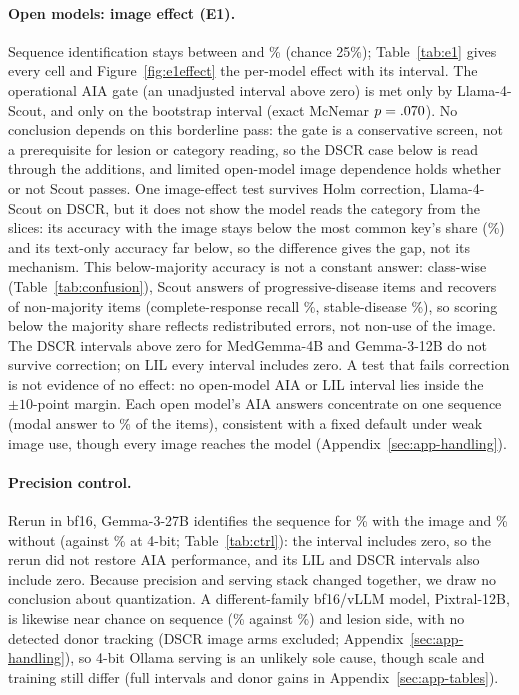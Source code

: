 \documentclass[11pt]{article}
\begin{document}
\paragraph{Open models: image effect (E1).} Sequence identification stays between \vfourEoneOwnAIAGemmaTwelve{} and \vfourEoneOwnAIAScout{}\% (chance 25\%); Table~\ref{tab:e1} gives every cell and Figure~\ref{fig:e1effect} the per-model effect with its interval. The operational AIA gate (an unadjusted interval above zero) is met only by Llama-4-Scout, and only on the bootstrap interval (exact McNemar $p=.070{}$). No conclusion depends on this borderline pass: the gate is a conservative screen, not a prerequisite for lesion or category reading, so the DSCR case below is read through the additions, and limited open-model image dependence holds whether or not Scout passes. One image-effect test survives Holm correction, Llama-4-Scout on DSCR, but it does not show the model reads the category from the slices: its accuracy with the image stays below the most common key's share (\vfourMajorityDSCR{}\%) and its text-only accuracy far below, so the difference gives the gap, not its mechanism. This below-majority accuracy is not a constant answer: class-wise (Table~\ref{tab:confusion}), Scout answers \vfourConfOnMajority{} of \vfourConfOnMajorityN{} progressive-disease items and recovers \vfourConfOffMajority{} of \vfourConfOffMajorityN{} non-majority items (complete-response recall \vfourConfRecallCR{}\%, stable-disease \vfourConfRecallSD{}\%), so scoring below the majority share reflects redistributed errors, not non-use of the image. The DSCR intervals above zero for MedGemma-4B and Gemma-3-12B do not survive correction; on LIL every interval includes zero. A test that fails correction is not evidence of no effect: no open-model AIA or LIL interval lies inside the $\pm10$-point margin. Each open model's AIA answers concentrate on one sequence (modal answer \vfourAiaModalShareLo{} to \vfourAiaModalShareHi{}\% of the \vfourNAIA{} items), consistent with a fixed default under weak image use, though every image reaches the model (Appendix~\ref{sec:app-handling}).

\paragraph{Precision control.} Rerun in bf16, Gemma-3-27B identifies the sequence for \vfourEoneOwnAIAGemmaTwentySevenBf{}\% with the image and \vfourEoneTextAIAGemmaTwentySevenBf{}\% without (against \vfourEoneOwnAIAGemmaTwentySeven{}\% at 4-bit; Table~\ref{tab:ctrl}): the interval includes zero, so the rerun did not restore AIA performance, and its LIL and DSCR intervals also include zero. Because precision and serving stack changed together, we draw no conclusion about quantization. A different-family bf16/vLLM model, Pixtral-12B, is likewise near chance on sequence (\vfourEoneOwnAIAPixtral{}\% against \vfourEoneTextAIAPixtral{}\%) and lesion side, with no detected donor tracking (DSCR image arms excluded; Appendix~\ref{sec:app-handling}), so 4-bit Ollama serving is an unlikely sole cause, though scale and training still differ (full intervals and donor gains in Appendix~\ref{sec:app-tables}).
\end{document}
